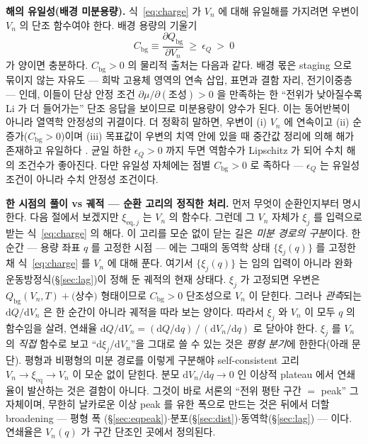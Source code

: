 \documentclass[11pt,a4paper]{article}
\newcommand{\dd}{\mathrm{d}}
\newcommand{\eq}{\mathrm{eq}}
\newcommand{\bg}{\mathrm{bg}}
\begin{document}
\textbf{해의 유일성(배경 미분용량).} 식~\eqref{eq:charge} 가 $V_n$ 에 대해 유일해를 가지려면 우변이 $V_n$ 의
단조 함수여야 한다. 배경 용량의 기울기
\begin{equation}
C_\bg\equiv\frac{\partial Q_\bg}{\partial V_n}\ \ge\ \epsilon_Q\ >\ 0
\label{eq:cbg}
\end{equation}
가 양이면 충분하다. $C_\bg>0$ 의 물리적 출처는 다음과 같다. 배경 몫은 staging 으로 묶이지 않는 자유도 — 희박
고용체 영역의 연속 삽입, 표면과 결함 자리, 전기이중층 — 인데, 이들이 단상 안정 조건
$\partial\mu/\partial(\text{조성})>0$ 을 만족하는 한 ``전위가 낮아질수록 Li 가 더 들어가는'' 단조 응답을 보이므로
미분용량이 양수가 된다. 이는 동어반복이 아니라 열역학 안정성의 귀결이다. 더 정확히 말하면, 우변이 (i) $V_n$ 에
연속이고 (ii) 순증가($C_\bg>0$)이며 (iii) 목표값이 우변의 치역 안에 있을 때 중간값 정리에 의해 해가 존재하고
유일하다 \cite{bazant2013}. 균일 하한 $\epsilon_Q>0$ 까지 두면 역함수가 Lipschitz 가 되어 수치 해의 조건수가
좋아진다. 다만 유일성 자체에는 점별 $C_\bg>0$ 로 족하다 — $\epsilon_Q$ 는 유일성 조건이 아니라 수치 안정성
조건이다.

\textbf{한 시점의 풀이 vs 궤적 — 순환 고리의 정직한 처리.} 먼저 무엇이 순환인지부터 명시한다. 다음 절에서
보겠지만 $\xi_{\eq,j}$ 는 $V_n$ 의 함수다. 그런데 그 $V_n$ 자체가 $\xi_j$ 를 입력으로 받는 식~\eqref{eq:charge}
의 해다. 이 고리를 모순 없이 닫는 길은 \emph{미분 경로의 구분}이다. 한 순간 — 용량 좌표 $q$ 를 고정한 시점 —
에는 그때의 동역학 상태 $\{\xi_j(q)\}$ 를 고정한 채 식~\eqref{eq:charge} 를 $V_n$ 에 대해 푼다. 여기서
$\{\xi_j(q)\}$ 는 임의 입력이 아니라 완화 운동방정식(\S\ref{sec:lag})이 정해 둔 궤적의 현재 상태다. $\xi_j$ 가
고정되면 우변은 $Q_\bg(V_n,T)+\text{(상수)}$ 형태이므로 $C_\bg>0$ 단조성으로 $V_n$ 이 닫힌다. 그러나 \emph{관측}되는
$\dd Q/\dd V_n$ 은 한 순간이 아니라 궤적을 따라 보는 양이다. 따라서 $\xi_j$ 와 $V_n$ 이 모두 $q$ 의 함수임을
살려, 연쇄율 $\dd Q/\dd V_n=(\dd Q/\dd q)\,/\,(\dd V_n/\dd q)$ 로 닫아야 한다. $\xi_j$ 를 $V_n$ 의 \emph{직접}
함수로 보고 ``$\dd\xi_j/\dd V_n$''을 그대로 쓸 수 있는 것은 \emph{평형 분기}에 한한다(아래 문단). 평형과 비평형의
미분 경로를 이렇게 구분해야 self-consistent 고리 $V_n\to\xi_{\eq}\to V_n$ 이 모순 없이 닫힌다. 분모
$\dd V_n/\dd q\to0$ 인 이상적 plateau 에서 연쇄율이 발산하는 것은 결함이 아니다. 그것이 바로 서론의 ``전위 평탄
구간 $=$ peak'' 그 자체이며, 무한히 날카로운 이상 peak 를 유한 폭으로 만드는 것은 뒤에서 더할 broadening — 평형 폭
(\S\ref{sec:eqpeak})$\cdot$분포(\S\ref{sec:dist})$\cdot$동역학(\S\ref{sec:lag}) — 이다. 연쇄율은 $V_n(q)$ 가
구간 단조인 곳에서 정의된다.
\end{document}
